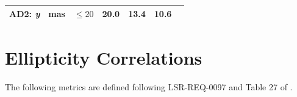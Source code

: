 \documentclass[DM,lsstdraft,toc]{lsstdoc}
\begin{document}
\begin{longtable}[]{@{}lllllll@{}}
\begin{minipage}[t]{0.12\columnwidth}
AD2: \emph{y}\strut
\end{minipage} & \begin{minipage}[t]{0.06\columnwidth}\raggedright\strut
mas\strut
\end{minipage} & \begin{minipage}[t]{0.14\columnwidth}\raggedright\strut
\(\leq 20\)\strut
\end{minipage} & \begin{minipage}[t]{0.14\columnwidth}\raggedright\strut
20.0\strut
\end{minipage} & \begin{minipage}[t]{0.12\columnwidth}\raggedright\strut
13.4\strut
\end{minipage} & \begin{minipage}[t]{0.12\columnwidth}\raggedright\strut
10.6\strut
\end{minipage} & \begin{minipage}[t]{0.17\columnwidth}\raggedright\strut
\strut
\end{minipage}\tabularnewline
\bottomrule
\end{longtable}

\section{Ellipticity Correlations}\label{ellipticity-correlations}

The following metrics are defined following LSR-REQ-0097
 and Table 27 of .
\end{document}
